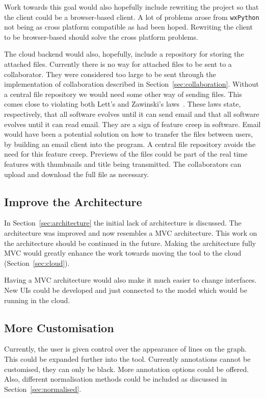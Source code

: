 Work towards this goal would also hopefully include rewriting the project so that the client could be a browser-based client.  A lot of problems arose from \texttt{wxPython} not being as cross platform compatible as had been hoped.  Rewriting the client to be browser-based should solve the cross platform problems.

The cloud backend would also, hopefully, include a repository for storing the attached files.  Currently there is no way for attached files to be sent to a collaborator.  They were considered too large to be sent through the implementation of collaboration described in Section~\ref{sec:collaboration}.  Without a central file repository we would need some other way of sending files.  This comes close to violating both Lett's and Zawinski's laws~\cite{atwood}.  These laws state, respectively, that all software evolves until it can send email and that all software evolves until it can read email.  They are a sign of feature creep in software.  Email would have been a potential solution on how to transfer the files between users, by building an email client into the program.  A central file repository avoids the need for this feature creep.  Previews of the files could be part of the real time features with thumbnails and title being transmitted.  The collaborators can upload and download the full file as necessary.

\subsection{Improve the Architecture}
\label{sec:conc_architect}

In Section~\ref{sec:architecture} the initial lack of architecture is discussed.  The architecture was improved and now resembles a \ac{MVC} architecture.  This work on the architecture should be continued in the future.  Making the architecture fully \ac{MVC} would greatly enhance the work towards moving the tool to the cloud (Section~\ref{sec:cloud}).

Having a \ac{MVC} architecture would also make it much easier to change interfaces.  New \acp{UI} could be developed and just connected to the model which would be running in the cloud.

\subsection{More Customisation}
Currently, the user is given control over the appearance of lines on the graph.  This could be expanded further into the tool.  Currently annotations cannot be customised, they can only be black.  More annotation options could be offered.  Also, different normalisation methods could be included as discussed in Section~\ref{sec:normalised}.

